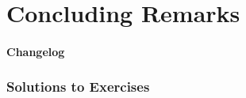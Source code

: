 \documentclass{config/zkdl-template}
\begin{document}

    
        
     
    

    \part{Concluding Remarks}\label{section:solutions}

    \subsection*{Changelog}
    

    \section*{Solutions to Exercises}
    

    
\end{document}
